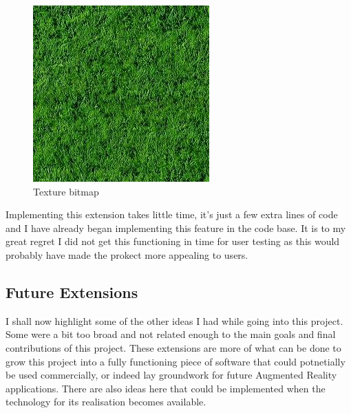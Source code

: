 \documentclass[11pt]{article}
\begin{document}
\begin{figure}[H]
	\centering
	\includegraphics[scale=0.7]{pics/texture.jpg}
	\caption{Texture bitmap}
	\label{bitmap}
\end{figure}

Implementing this extension takes little time, it's just a few extra lines
of code and I have already began implementing this feature in the code base.
It is to my great regret I did not get this functioning in time for user
testing as this would probably have made the prokect more appealing to
users.

\subsection{Future Extensions}
I shall now highlight some of the other ideas I had while going into this 
project. Some were a bit too broad and not related enough to the main
goals and final contributions of this project. These extensions are more of what
can be done to grow this project into a fully functioning piece of 
software that could potnetially be used commercially, or indeed lay 
groundwork for future Augmented Reality applications. There are also ideas 
here that could be implemented when the technology for its realisation 
becomes available.
\end{document}
